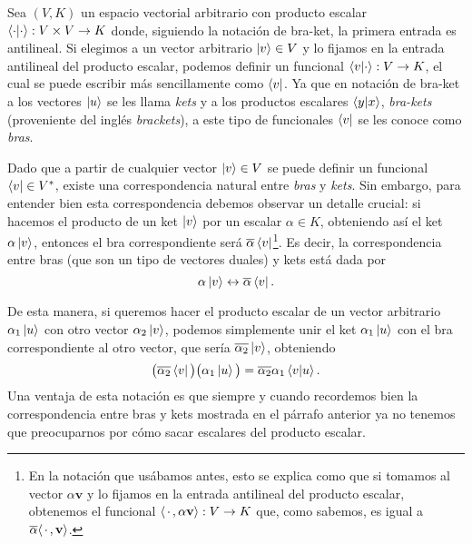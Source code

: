\documentclass[12pt,dvipsnames]{article}
\begin{document}
Sea $(V,K)$ un espacio vectorial arbitrario con producto escalar $\braket{\cdot|\cdot}:V\times V\to K$ donde, siguiendo la notación de bra-ket, la primera entrada es antilineal. Si elegimos a un vector arbitrario $\ket{v}\in V$ y lo fijamos en la entrada antilineal del producto escalar, podemos definir un funcional $\braket{v|\cdot}:V\to K$, el cual se puede escribir más sencillamente como $\bra{v}$. Ya que en notación de bra-ket a los vectores $\ket{u}$ se les llama \emph{kets} y a los productos escalares $\braket{y|x}$, \emph{bra-kets} (proveniente del inglés \emph{brackets}), a este tipo de funcionales $\bra{v}$ se les conoce como \emph{bras}.

Dado que a partir de cualquier vector $\ket{v}\in V$ se puede definir un funcional $\bra{v}\in V^*$, existe una correspondencia natural entre \emph{bras} y \emph{kets}. Sin embargo, para entender bien esta correspondencia debemos observar un detalle crucial: si hacemos el producto de un ket $\ket{v}$ por un escalar $\alpha\in K$, obteniendo así el ket $\alpha\ket{v}$, entonces el bra correspondiente será $\overline{\alpha}\bra{v}$\footnote{En la notación que usábamos antes, esto se explica como que si tomamos al vector $\alpha\mathbf{v}$ y lo fijamos en la entrada antilineal del producto escalar, obtenemos el funcional $\langle\hspace{0.5mm}\cdot\hspace{0.5mm} , \alpha\mathbf{v}\rangle:V\to K$ que, como sabemos, es igual a $\overline{\alpha}\langle\hspace{0.5mm} \cdot\hspace{0.5mm} ,\mathbf{v}\rangle$.}. Es decir, la correspondencia entre bras (que son un tipo de vectores duales) y kets está dada por \[
    \alpha\ket{v} \leftrightarrow \overline{\alpha}\bra{v}
.\] 

De esta manera, si queremos hacer el producto escalar de un vector arbitrario $\alpha_1 \ket{u}$ con otro vector $\alpha_2 \ket{v}$, podemos simplemente unir el ket $\alpha_1 \ket{u}$ con el bra correspondiente al otro vector, que sería $\overline{\alpha_2}\ket{v}$, obteniendo \[
    \big(\overline{\alpha_2}\bra{v}\big)\big(\alpha_1\ket{u}\big) = \overline{\alpha_2}\alpha_1\braket{v|u}
.\] Una ventaja de esta notación es que \textemdash siempre y cuando recordemos bien la correspondencia entre bras y kets mostrada en el párrafo anterior\textemdash\hspace{0.5mm} ya no tenemos que preocuparnos por cómo sacar escalares del producto escalar.
\end{document}
